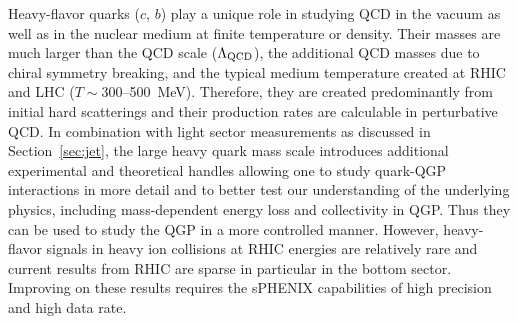 Heavy-flavor quarks ($c$, $b$) play a unique role in studying QCD in
the vacuum as well as in the nuclear medium at finite temperature or
density. Their masses are much larger than the QCD scale
($\Lambda_{\rm QCD}$), the additional QCD masses due to chiral
symmetry breaking, and the typical medium temperature created at RHIC
and LHC ($T \sim 300$--500~MeV). Therefore, they are created
predominantly from initial hard scatterings and their production rates
are calculable in perturbative QCD. In combination with light sector
measurements as discussed in Section~\ref{sec:jet}, the large heavy
quark mass scale introduces additional experimental and theoretical
handles allowing one to study quark-QGP interactions in more detail
and to better test our understanding of the underlying physics,
including mass-dependent energy loss and collectivity in QGP. Thus
they can be used to study the QGP in a more controlled manner.
However, heavy-flavor signals in heavy ion collisions at RHIC energies
are relatively rare and current results from RHIC are sparse in
particular in the bottom sector.  Improving on these results requires
the sPHENIX capabilities of high precision and high data rate.


